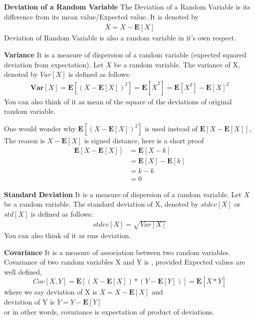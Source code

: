 \documentclass[10pt,a4paper]{article}
\begin{document}
	\begin{defn}{\textbf{Deviation of a Random Variable}}
	The Deviation of a Random Variable is its difference from its mean value/Expected value. It is denoted by 
	\begin{align}
		\overline{X} = X - \mathbf{E}[X]
	\end{align}
	Deviation of Random Variable is also a random variable in it's
	own respect.
	\end{defn}

	\begin{defn}{\textbf{Variance}}
		It is a measure of dispersion of a random variable (expected squared deviation from expectation). Let $X$ be a random variable. The variance of X, denoted by $Var[X]$ is defined as follows:\\
		\begin{align}
			\mathbf{Var}[X] = \mathbf{E}[(X - \mathbf{E}[X])^2] = \mathbf{E}[\overline{X}^2]
			 = \mathbf{E}[X^2] - \mathbf{E}[X]^2
		\end{align}
		You can also think of it as mean of the square of the deviations of original random variable.
		
		One would wonder why $\mathbf{E}[(X- \mathbf{E}[X])^2]$ is used instead of $\mathbf{E}[X - \mathbf{E}[X]]$,
		The reason is $X - \mathbf{E}[X]$ is signed distance, here is a short proof 
		\begin{align}
			\mathbf{E}[X - \mathbf{E}[X]] &= \mathbf{E}[X - k] \\
			            &= \mathbf{E}[X] - \mathbf{E}[k] \\
			            &= k - k \\
			            &= 0
		\end{align} 
	\end{defn}

	\begin{defn}{\textbf{Standard Deviation}}
	It is a measure of dispersion of a random variable. Let $X$ be a random variable. The standard deviation of X, denoted by $stdev[X]$ or $std[X]$ is defined as follows:\\
	\begin{align}
	stdev[X] = \sqrt{Var[X]}
	\end{align}
	You can also think of it as rms deviation.
	\end{defn}


	\begin{defn}{\textbf{Covariance}}
	It is a measure of association between two random variables.
	Covariance of two random variables X and Y is , provided Expected values are well defined,
	\begin{equation}
		Cov[X,Y] = \mathbf{E}[ (X - \mathbf{E}[X]) * (Y - \mathbf{E}[Y]) ] = \mathbf{E}[\overline{X} * \overline{Y}]
	\end{equation}
	where we say deviation of X is $\overline{X} = X - \mathbf{E}[X]$ and \\
	deviation of Y is $\overline{Y} = Y - \mathbf{E}[Y]$\\
	or in other words, covariance is expectation of product of deviations.
	\end{defn}
\end{document}
